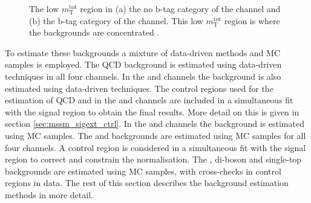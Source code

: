 \begin{figure}[h!]
\begin{center}
\end{center}
\caption[The low \mTtot~region in the no b-tag category of the \mutau channel 
and in the b-tag category of the \emu channel.]{The low $m_{\text{T}}^{\text{tot}}$ region in (a) the 
no b-tag category of the \mutau channel and (b) the b-tag category of the \emu channel.
This low $m_{\text{T}}^{\text{tot}}$ region is where the backgrounds
are concentrated \cite{CMS-PAS-HIG-16-037-addit}.}
\label{fig:mssm_bkgs_overview}
\end{figure}

To estimate these backgrounds a mixture of data-driven 
methods and \ac{MC} samples is employed. The QCD background
is estimated using data-driven techniques in all four channels.
In the \mutau and \etau channels the \Wjets background is also
estimated using data-driven techniques. The control regions used
for the estimation of QCD and \Wjets in the \etau and \mutau channels
are included in a simultaneous fit with the signal region to obtain
the final results. More detail on this is given in section \ref{sec:mssm_sigext_ctrl}.
In the \emu and \tautau channels the \Wjets background is estimated using
\ac{MC} samples. The \Ztautau and \Zellell backgrounds are estimated
using \ac{MC} samples for all four channels. A \Zmm control region
is considered in a simultaneous fit with the signal region to correct and
constrain the \Ztautau normalisation.
The \ttbar, di-boson and single-top backgrounds are estimated
using \ac{MC} samples, with cross-checks in control regions in data.
The rest of this section describes the background estimation methods
in more detail.

